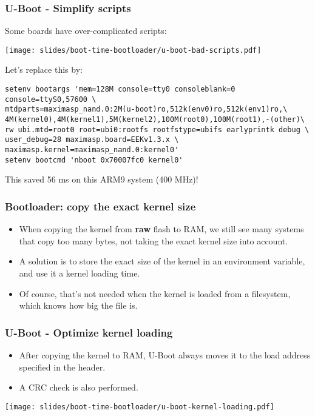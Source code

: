 \begin{frame}[fragile]
\frametitle{U-Boot - Simplify scripts}
Some boards have over-complicated scripts:
\begin{center}
    \texttt{[image: slides/boot-time-bootloader/u-boot-bad-scripts.pdf]}
\end{center}
Let's replace this by:
\begin{block}{}
\footnotesize
\begin{verbatim}
setenv bootargs 'mem=128M console=tty0 consoleblank=0
console=ttyS0,57600 \
mtdparts=maximasp_nand.0:2M(u-boot)ro,512k(env0)ro,512k(env1)ro,\
4M(kernel0),4M(kernel1),5M(kernel2),100M(root0),100M(root1),-(other)\
rw ubi.mtd=root0 root=ubi0:rootfs rootfstype=ubifs earlyprintk debug \
user_debug=28 maximasp.board=EEKv1.3.x \
maximasp.kernel=maximasp_nand.0:kernel0'
setenv bootcmd 'nboot 0x70007fc0 kernel0'
\end{verbatim}
\end{block}
This saved 56 ms on this ARM9 system (400 MHz)!
\end{frame}

\begin{frame}
\frametitle{Bootloader: copy the exact kernel size}
\begin{itemize}
\item When copying the kernel from {\bf raw} flash to RAM, we still see
      many systems that copy too many bytes, not taking the
      exact kernel size into account.
\item A solution is to store the exact size of the kernel in an environment
      variable, and use it a kernel loading time.
\item Of course, that's not needed when the kernel is loaded from a
      filesystem, which knows how big the file is.
\end{itemize}
\end{frame}

\begin{frame}
\frametitle{U-Boot - Optimize kernel loading}
\begin{itemize}
\item After copying the kernel  to RAM,
      U-Boot always moves it to the load address specified
      in the  header.
\item A CRC check is also performed.
\end{itemize}
\begin{center}
    \texttt{[image: slides/boot-time-bootloader/u-boot-kernel-loading.pdf]}
\end{center}
\end{frame}

